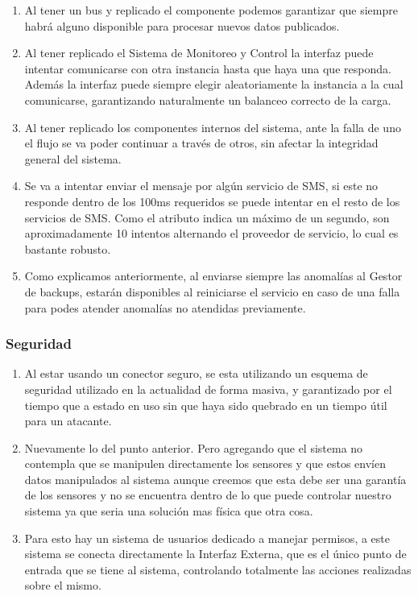 \documentclass{article}
\theoremstyle{definition}
\theoremstyle{remark}
\begin{document}
\begin{enumerate}
  \item Al tener un bus y replicado el componente podemos garantizar que siempre habrá alguno disponible para procesar nuevos datos publicados.
  \item Al tener replicado el Sistema de Monitoreo y Control la interfaz puede intentar comunicarse con otra instancia hasta que haya una que responda. Además la interfaz puede siempre elegir aleatoriamente la instancia a la cual comunicarse, garantizando naturalmente un balanceo correcto de la carga.
  \item Al tener replicado los componentes internos del sistema, ante la falla de uno el flujo se va poder continuar a través de otros, sin afectar la integridad general del sistema.
  \item Se va a intentar enviar el mensaje por algún servicio de SMS, si este no responde dentro de los 100ms requeridos se puede intentar en el resto de los servicios de SMS. Como el atributo indica un máximo de un segundo, son aproximadamente 10 intentos alternando el proveedor de servicio, lo cual es bastante robusto.
  \item Como explicamos anteriormente, al enviarse siempre las anomalías al Gestor de backups, estarán disponibles al reiniciarse el servicio en caso de una falla para podes atender anomalías no atendidas previamente.

\end{enumerate}

\subsubsection{Seguridad}

\begin{enumerate}
  \item Al estar usando un conector seguro, se esta utilizando un esquema de seguridad utilizado en la actualidad de forma masiva, y garantizado por el tiempo que a estado en uso sin que haya sido quebrado en un tiempo útil para un atacante.
  \item Nuevamente lo del punto anterior. Pero agregando que el sistema no contempla que se manipulen directamente los sensores y que estos envíen datos manipulados al sistema aunque creemos que esta debe ser una garantía de los sensores y no se encuentra dentro de lo que puede controlar nuestro sistema ya que seria una solución mas física que otra cosa.
  \item Para esto hay un sistema de usuarios dedicado a manejar permisos, a este sistema se conecta directamente la Interfaz Externa, que es el único punto de entrada que se tiene al sistema, controlando totalmente las acciones realizadas sobre el mismo.
\end{enumerate}
\end{document}
